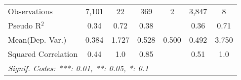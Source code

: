 \begin{tabular}{lcccccc}
   Observations                                               & 7,101        & 22      & 369           & 2    & 3,847   & 8\\  
   Pseudo R$^2$                                               & 0.34         & 0.72    & 0.38          &      & 0.36    & 0.71\\  
Mean(Dep. Var.) & 0.384 & 1.727 & 0.528 & 0.500 & 0.492 & 3.750 \\
   Squared Correlation                                        & 0.44         & 1.0     & 0.85          &      & 0.51    & 1.0\\  
   \midrule \midrule
   \multicolumn{7}{l}{\emph{Signif. Codes: ***: 0.01, **: 0.05, *: 0.1}}\\
\end{tabular}
\par\endgroup
